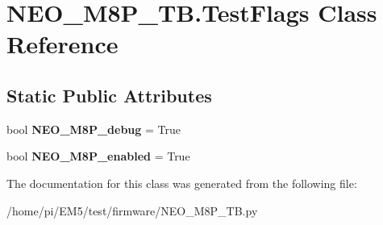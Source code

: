 \hypertarget{classNEO__M8P__TB_1_1TestFlags}{}\section{N\+E\+O\+\_\+\+M8\+P\+\_\+\+T\+B.\+Test\+Flags Class Reference}
\label{classNEO__M8P__TB_1_1TestFlags}
\subsection*{Static Public Attributes}
\begin{DoxyCompactItemize}
\item 
\mbox{\label{classNEO__M8P__TB_1_1TestFlags_a609d34875eef7d22bad369e5f5176d29}} 
bool {\bfseries N\+E\+O\+\_\+\+M8\+P\+\_\+debug} = True
\item 
\mbox{\label{classNEO__M8P__TB_1_1TestFlags_a000b79fa81452932ebfb987d4ff0284a}} 
bool {\bfseries N\+E\+O\+\_\+\+M8\+P\+\_\+enabled} = True
\end{DoxyCompactItemize}


The documentation for this class was generated from the following file\+:\begin{DoxyCompactItemize}
\item 
/home/pi/\+E\+M5/test/firmware/N\+E\+O\+\_\+\+M8\+P\+\_\+\+T\+B.\+py\end{DoxyCompactItemize}
